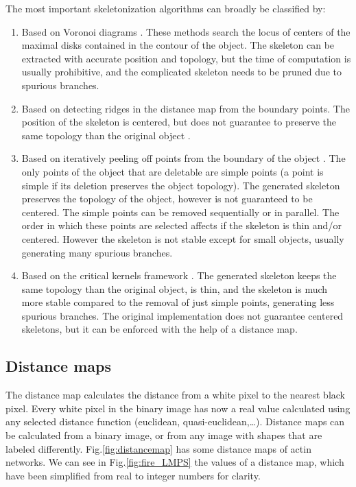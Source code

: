 The most important skeletonization algorithms can broadly be classified by:

\begin{enumerate}
  \item \label{itm:voronoi} Based on Voronoi diagrams \citep{ogniewicz_hierarchic_1995}.
    These methods search the locus of centers of the maximal disks
    contained in the contour of the object. The skeleton can be
    extracted with accurate position and topology, but the time
    of computation is usually prohibitive, and the complicated skeleton needs to be
    pruned due to spurious branches.
  \item \label{itm:ridges} Based on detecting ridges
    in the distance map from the boundary points. The
    position of the skeleton is centered, but does not guarantee to preserve
    the same topology than the original object
    \citep{ge_generation_1996}.
  \item \label{itm:simple} Based on iteratively peeling off points from the boundary of the object \cite{palagyi_sequential_2001,brimkov_topology_2012}. The only points of the object that are deletable are simple points (a point is simple if its deletion preserves
    the object topology). The generated skeleton preserves the topology of the object, however is not guaranteed to be centered. The simple points can be removed sequentially or in parallel.
    The order in which these points are selected affects if the skeleton is thin and/or centered. However the skeleton is not stable except for small objects, usually generating many spurious branches.
  \item \label{itm:critical} Based on the critical kernels framework \cite{couprie_asymmetric_2016}. The generated skeleton keeps the same topology than the original object, is thin, and the skeleton is much more stable compared to the removal of just simple points, generating less spurious branches. The original implementation \cite{couprie_asymmetric_2016} does not guarantee centered skeletons, but it can be enforced with the help of a distance map.
\end{enumerate}

\subsection{Distance maps}%
\label{sub:distance_maps}

The distance map calculates the distance from a
white pixel to the nearest black pixel. Every white pixel in the binary image
has now a real value calculated using any selected distance function (euclidean,
quasi-euclidean,\ldots ). Distance maps can be calculated from a binary image, or from
any image with shapes that are labeled differently.
Fig.\ref{fig:distancemap} has some distance maps of actin networks.
We can see in Fig.\ref{fig:fire_LMPS} the values of a distance map, which have
been simplified from real to integer numbers for clarity.

